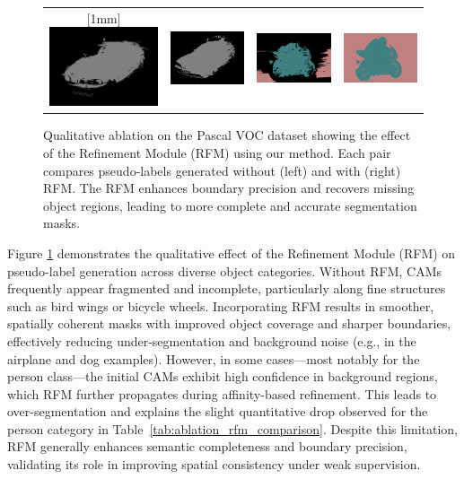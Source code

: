 \begin{figure}[H]
\begin{tabular}{c c c c}
    [1mm]
    \includegraphics[width=0.18\linewidth, height=0.18\linewidth]{figures/ablation/withoutrfm/2010_003276_[6]} &
    \includegraphics[width=0.18\linewidth, height=0.18\linewidth]{figures/ablation/withrfm/2010_003276_[6]} & \hspace{2pt}
    \includegraphics[width=0.18\linewidth, height=0.18\linewidth]{figures/ablation/withoutrfm/2009_000074_[13, 14]} &
    \includegraphics[width=0.18\linewidth, height=0.18\linewidth]{figures/ablation/withrfm/2009_000074_[13, 14]} \\
  \end{tabular}

  \caption{Qualitative ablation on the Pascal VOC dataset showing the effect of the Refinement Module (RFM) \cite{wsss_frozen_clip} using our method. Each pair compares pseudo-labels generated without (left) and with (right) RFM. The RFM enhances boundary precision and recovers missing object regions, leading to more complete and accurate segmentation masks.}
  \label{fig:qualitative_ablation}
\end{figure}

Figure \ref{fig:qualitative_ablation} demonstrates the qualitative effect of the Refinement Module (RFM) on pseudo-label generation across diverse object categories. Without RFM, CAMs frequently appear fragmented and incomplete, particularly along fine structures such as bird wings or bicycle wheels. Incorporating RFM results in smoother, spatially coherent masks with improved object coverage and sharper boundaries, effectively reducing under-segmentation and background noise (e.g., in the airplane and dog examples). However, in some cases—most notably for the person class—the initial CAMs exhibit high confidence in background regions, which RFM further propagates during affinity-based refinement. This leads to over-segmentation and explains the slight quantitative drop observed for the person category in Table~\ref{tab:ablation_rfm_comparison}. Despite this limitation, RFM generally enhances semantic completeness and boundary precision, validating its role in improving spatial consistency under weak supervision.

